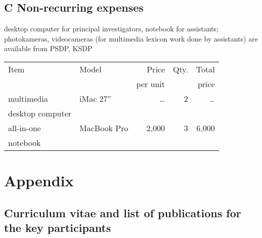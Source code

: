 \documentclass[a4paper,12pt]{article}
\begin{document}


\subsection*{C Non-recurring expenses}
\noindent desktop computer for principal investigators, notebook for assistants; photokameras, videocameras (for multimedia lexicon work done by assistants) are available from PSDP, KSDP
\begin{longtable}{| l | l | r | r | r |}
\hline
Item&Model&Price&Qty.&Total\\
	&&per unit&&price\\
\hline
multimedia&iMac 27”&…&2&…\\
desktop computer&&&&\\
\hline
all-in-one&MacBook Pro&2,000&3&6,000\\
notebook&&&&\\
\hline
\end{longtable}

\newpage
\section*{Appendix}
\subsection*{Curriculum vitae and list of publications for the key participants}
\end{document}
